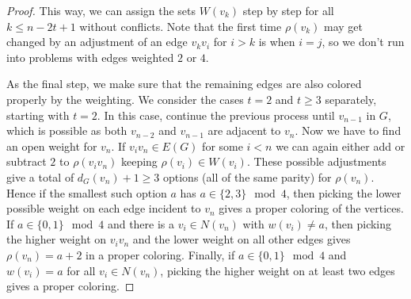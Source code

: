 \documentclass[reqno,12pt,epsf]{amsart}
\def\om{\omm}
\def\omm{\rho}
\begin{document}
\begin{proof}
This way, we can assign the sets $W(v_k)$ step by step for all $k\le n-2t+1$ without conflicts. Note that the first time $\om(v_k)$ may get changed by an adjustment of an edge $v_kv_i$ for $i>k$ is when $i=j$, so we don't run into problems with edges weighted $2$ or $4$.

%

As the final step, we make sure that the remaining edges are also colored properly by the weighting. 
We consider the cases $t=2$ and $t\ge 3$ separately, starting with $t=2$.
In this case, continue the previous process until $v_{n-1}$ in $G$, which is possible as both $v_{n-2}$ and $v_{n-1}$ are adjacent to $v_n$. Now we have to find an open weight for $v_n$.
If $v_iv_n\in E(G)$ for some $i<n$ we can again either add or subtract $2$ to $\om(v_iv_n)$ keeping $\om(v_i)\in W(v_i)$.
These possible adjustments give a total of $d_{G}(v_n)+1\ge 3$ options (all of the same parity) for $\om(v_n)$. Hence if the smallest such
option $a$ has $a\in\{2,3\}\mod 4$, then picking the lower possible weight on each edge incident to $v_n$ gives a proper coloring of the vertices. If $a\in\{0,1\}\mod 4$ and there is a $v_i\in N(v_n)$ with $w(v_i)\ne a$, then picking the higher weight on $v_iv_n$ and the lower weight on all other edges gives $\om(v_n)=a+2$ in a proper coloring. Finally, if $a\in\{0,1\}\mod 4$ and $w(v_i)= a$ for all $v_i\in N(v_n)$, picking the higher weight on at least two edges gives a proper coloring.




\end{proof}
\end{document}
